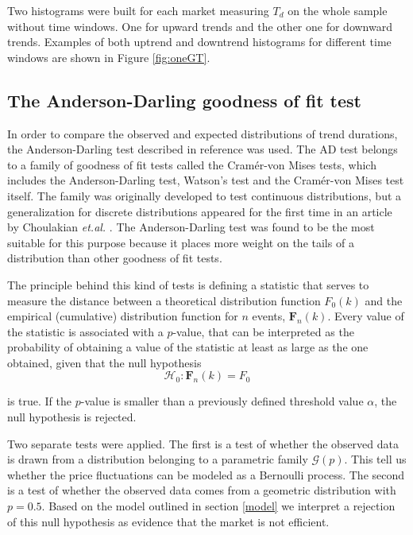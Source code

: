 \documentclass[a4paper]{jpconf}
\begin{document}
Two histograms were built for each market measuring $T_d$ on the whole sample without time windows. One for upward trends and the other one for downward trends. Examples of both uptrend and downtrend histograms for different time windows are shown in Figure \ref{fig:oneGT}.


\subsection{The Anderson-Darling goodness of fit test}
In order to compare the observed and expected distributions of trend durations, the Anderson-Darling test described in reference \cite{Anderson} was used. The AD test belongs to a family of goodness of fit tests called the Cramér-von Mises tests, which includes the Anderson-Darling test, Watson's test and the Cramér-von Mises test itself. The family was originally developed to test continuous distributions, but a generalization for discrete distributions appeared for the first time in an article by Choulakian {\it et.al.} \cite{Choulakian}. The Anderson-Darling test was found to be the most suitable for this purpose because it places more weight on the tails of a distribution than other goodness of fit tests.

The principle behind this kind of tests is defining a statistic that serves to measure the distance between a theoretical distribution function $F_0(k)$ and the empirical (cumulative) distribution function for $n$ events, $\mathbf{F}_n(k)$. Every value of the statistic is associated with a $p$-value, that can be interpreted as the probability of obtaining a value of the statistic at least as large as the one obtained, given that the null hypothesis
\begin{equation}  \label{eq_null_hypothesis} 
\mathcal{H}_0: \mathbf{F}_n(k) = F_0 
\end{equation}

\noindent is true. If the $p$-value is smaller than a previously defined threshold value $\alpha$, the null hypothesis is rejected.

Two separate tests were applied. The first is a test of whether the observed data is drawn from a distribution belonging to a parametric family $\mathcal{G}(p)$. This tell us whether the price fluctuations can be modeled as a Bernoulli process. The second is a test of whether the observed data comes from a geometric distribution with $p = 0.5$. Based on the model outlined in section \ref{model} we interpret a rejection of this null hypothesis as evidence that the market is not efficient.
\end{document}
